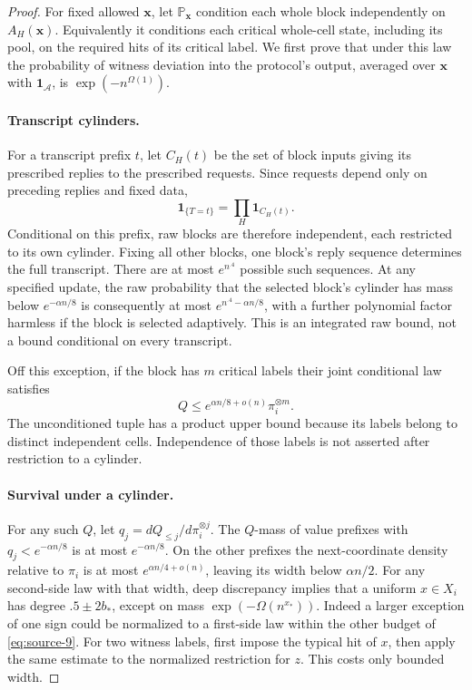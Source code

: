 \begin{proof}
For fixed allowed \(\boldsymbol x\), let \(\mathbb P_{\boldsymbol x}\)
condition each whole block independently on \(A_H(\boldsymbol x)\).
Equivalently it conditions each critical whole-cell state, including
its pool, on the required hits of its critical label. We first prove
that under this law the probability of witness deviation into the
protocol's output, averaged over \(\boldsymbol x\) with
\(\mathbf1_{\mathcal A}\), is \(\exp(-n^{\Omega(1)})\).

\paragraph{Transcript cylinders.}
For a transcript prefix \(t\), let \(C_H(t)\) be the set of block
inputs giving its prescribed replies to the prescribed requests.
Since requests depend only on preceding replies and fixed data,
\[
 \mathbf1_{\{T=t\}}=\prod_H\mathbf1_{C_H(t)}.
\]
Conditional on this prefix, raw blocks are therefore independent,
each restricted to its own cylinder. Fixing all other blocks, one
block's reply sequence determines the full transcript. There are at
most \(e^{n^{.4}}\) possible such sequences. At any specified update,
the raw probability that the selected block's cylinder has mass below
\(e^{-\alpha n/8}\) is consequently at most
\(e^{n^{.4}-\alpha n/8}\), with a further polynomial factor harmless
if the block is selected adaptively. This is an integrated raw bound,
not a bound conditional on every transcript.

Off this exception, if the block has \(m\) critical labels their joint
conditional law satisfies
\[
 Q\le e^{\alpha n/8+o(n)}\pi_i^{\otimes m}.
\]
The unconditioned tuple has a product upper bound because its labels
belong to distinct independent cells. Independence of those labels is
not asserted after restriction to a cylinder.

\paragraph{Survival under a cylinder.}
For any such \(Q\), let
\(q_j=dQ_{\le j}/d\pi_i^{\otimes j}\). The \(Q\)-mass of value
prefixes with \(q_j<e^{-\alpha n/8}\) is at most
\(e^{-\alpha n/8}\). On the other prefixes the next-coordinate
density relative to \(\pi_i\) is at most
\(e^{\alpha n/4+o(n)}\), leaving its width below \(\alpha n/2\).
For any second-side law with that width, deep discrepancy implies
that a uniform \(x\in X_i\) has degree \(.5\pm2b_*\), except
on mass \(\exp(-\Omega(n^{x_*}))\). Indeed a larger exception of
one sign could be normalized to a first-side law within the other
budget of \eqref{eq:source-9}. For two witness labels, first impose
the typical hit of \(x\), then apply the same estimate to the
normalized restriction for \(z\). This costs only bounded width.


\end{proof}
